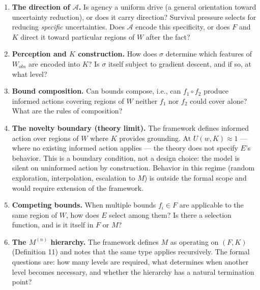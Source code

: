 \documentclass[
]{article}
\begin{document}
\begin{enumerate}
  Formal derivation of this claim from thermodynamic first principles
  (connecting \(U_{lethal}^d\) to physical entropy thresholds and
  demonstrating the inevitability of primitive \(\mathcal{A}\) from
  dissipative system dynamics) remains open. See {[}Prigogine1984{]}
  (dissipative structures), {[}England2013{]} (dissipative adaptation),
  and {[}Schrodinger1944{]} (negative entropy and life) for adjacent
  physical frameworks.
\item
  \textbf{The direction of \(\mathcal{A}\).} Is agency a uniform drive
  (a general orientation toward uncertainty reduction), or does it carry
  direction? Survival pressure selects for reducing \emph{specific}
  uncertainties. Does \(\mathcal{A}\) encode this specificity, or does
  \(F\) and \(K\) direct it toward particular regions of \(W\) after the
  fact?
\item
  \textbf{Perception and \(K\) construction.} How does \(\sigma\)
  determine which features of \(W_{obs}\) are encoded into \(K\)? Is
  \(\sigma\) itself subject to gradient descent, and if so, at what
  level?
\item
  \textbf{Bound composition.} Can bounds compose, i.e., can
  \(f_1 \circ f_2\) produce informed actions covering regions of \(W\)
  neither \(f_1\) nor \(f_2\) could cover alone? What are the rules of
  composition?
\item
  \textbf{The novelty boundary (theory limit).} The framework defines
  informed action over regions of \(W\) where \(K\) provides grounding.
  At \(U(w, K) \approx 1\) --- where no existing informed action applies
  --- the theory does not specify \(E\)'s behavior. This is a boundary
  condition, not a design choice: the model is silent on uninformed
  action by construction. Behavior in this regime (random exploration,
  interpolation, escalation to \(M\)) is outside the formal scope and
  would require extension of the framework.
\item
  \textbf{Competing bounds.} When multiple bounds \(f_i \in F\) are
  applicable to the same region of \(W\), how does \(E\) select among
  them? Is there a selection function, and is it itself in \(F\) or
  \(M\)?
\item
  \textbf{The \(M^{(n)}\) hierarchy.} The framework defines \(M\) as
  operating on \((F, K)\) (Definition 11) and notes that the same type
  applies recursively. The formal questions are: how many levels are
  required, what determines when another level becomes necessary, and
  whether the hierarchy has a natural termination point?


\end{enumerate}
\end{document}
